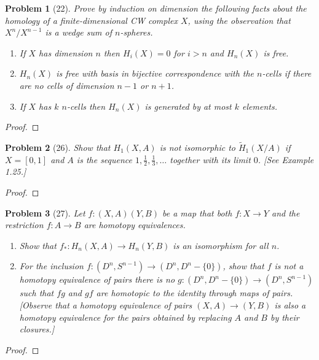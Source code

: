 \documentclass[10pt]{article}
\newcommand{\sk}{\vskip 10mm}
\theoremstyle{plain}
\newtheorem{problem}{Problem}
\theoremstyle{remark}
\begin{document}
\begin{problem}[22]
  Prove by induction on dimension the following facts about the
  homology of a finite-dimensional CW complex $X$, using the observation
  that $X^n/X^{n-1}$ is a wedge sum of $n$-spheres.
  \begin{enumerate}
  \item[(a)] If $X$ has dimension $n$ then $H_i(X)=0$ for $i>n$ and
    $H_n(X)$ is free.
  \item[(b)] $H_n(X)$ is free with basis in bijective correspondence
    with the $n$-cells if there are no cells of dimension $n-1$ or $n+1$.
  \item[(c)]  If $X$ has $k$ $n$-cells then $H_n(X)$ is generated by
    at most $k$ elements.
  \end{enumerate}
\end{problem}

\begin{proof}
  
\end{proof}

\sk

\begin{problem}[26]
  Show that $H_1(X,A)$ is not isomorphic to $\widetilde{H}_1(X/A)$ if
  $X=[0,1]$ and $A$ is the sequence $1,\frac{1}{2},\frac{1}{3},\ldots$
  together with its limit $0$. [See Example 1.25.]
\end{problem}

\begin{proof}
  
\end{proof}

\sk

\begin{problem}[27]
  Let $f:(X,A)(Y,B)$ be a map that both $f:X\rightarrow Y$ and the restriction
  $f:A\rightarrow B$ are homotopy equivalences.
  \begin{enumerate}
  \item[(a)] Show that $f_*:H_n(X,A)\rightarrow H_n(Y,B)$ is an
    isomorphism for all $n$.
  \item[(b)] For the inclusion $f:(D^n,S^{n-1})\rightarrow(D^n,D^n-\{0\})$, show
    that $f$ is not a homotopy equivalence of pairs \textemdash there
    is no $g:(D^n,D^n-\{0\})\rightarrow(D^n,S^{n-1})$ such that $fg$
    and $gf$ are homotopic to the identity through maps of pairs.
    [Observe that a homotopy equivalence of pairs $(X,A)\rightarrow(Y,B)$
    is also a homotopy equivalence for the pairs obtained by
    replacing $A$ and $B$ by their closures.]
  \end{enumerate}
\end{problem}

\begin{proof}
  
\end{proof}

\end{document}

